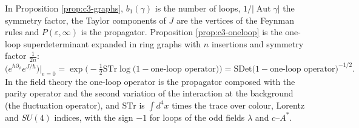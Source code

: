 \begin{remark}
In Proposition \ref{prop:c3-graphs}, $b_1(\gamma)$ is the number of loops, $1/|\operatorname{Aut}\gamma|$ the symmetry factor, the Taylor components of $J$ are the vertices of the Feynman rules and $P(\varepsilon,\infty)$ is the propagator. Proposition \ref{prop:c3-oneloop} is the one-loop superdeterminant expanded in ring graphs with $n$ insertions and symmetry factor $\frac1{2n}$:
\[
\big(e^{\hbar\partial_\phi}e^{J/\hbar}\big)\big|_{e=0}=\exp\Big(-\tfrac12\mathrm{STr}\log\big(1-\text{one-loop operator}\big)\Big)=\mathrm{SDet}\big(1-\text{one-loop operator}\big)^{-1/2}.
\]
In the field theory the one-loop operator is the propagator composed with the parity operator and the second variation of the interaction at the background (the fluctuation operator), and $\mathrm{STr}$ is $\int d^4x$ times the trace over colour, Lorentz and $SU(4)$ indices, with the sign $-1$ for loops of the odd fields $\lambda$ and $c$--$A^*$.
\end{remark}
